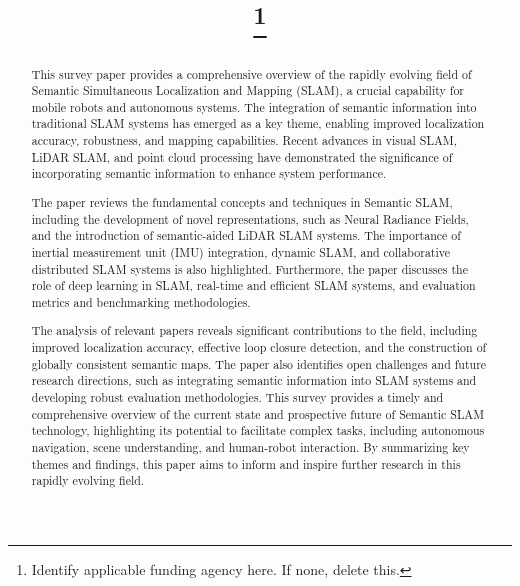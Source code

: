 \documentclass[conference]{IEEEtran}
\begin{document}
\title{
\thanks{Identify applicable funding agency here. If none, delete this.}
}

\author{
\and
{}
}

\maketitle

\begin{abstract}
This survey paper provides a comprehensive overview of the rapidly evolving field of Semantic Simultaneous Localization and Mapping (SLAM), a crucial capability for mobile robots and autonomous systems. The integration of semantic information into traditional SLAM systems has emerged as a key theme, enabling improved localization accuracy, robustness, and mapping capabilities. Recent advances in visual SLAM, LiDAR SLAM, and point cloud processing have demonstrated the significance of incorporating semantic information to enhance system performance.

The paper reviews the fundamental concepts and techniques in Semantic SLAM, including the development of novel representations, such as Neural Radiance Fields, and the introduction of semantic-aided LiDAR SLAM systems. The importance of inertial measurement unit (IMU) integration, dynamic SLAM, and collaborative distributed SLAM systems is also highlighted. Furthermore, the paper discusses the role of deep learning in SLAM, real-time and efficient SLAM systems, and evaluation metrics and benchmarking methodologies.

The analysis of relevant papers reveals significant contributions to the field, including improved localization accuracy, effective loop closure detection, and the construction of globally consistent semantic maps. The paper also identifies open challenges and future research directions, such as integrating semantic information into SLAM systems and developing robust evaluation methodologies. This survey provides a timely and comprehensive overview of the current state and prospective future of Semantic SLAM technology, highlighting its potential to facilitate complex tasks, including autonomous navigation, scene understanding, and human-robot interaction. By summarizing key themes and findings, this paper aims to inform and inspire further research in this rapidly evolving field.
\end{abstract}
\end{document}
